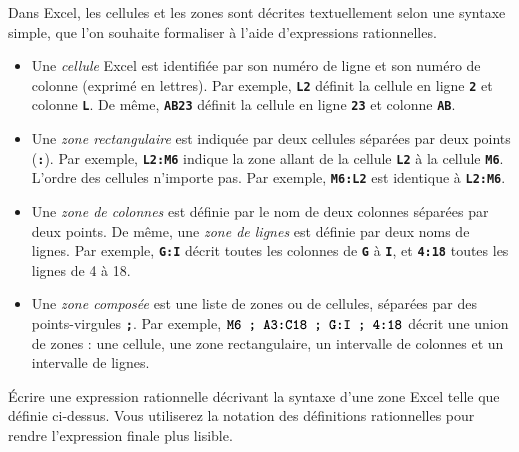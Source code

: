 
\begingroup

\newcommand{\excell}[1]{\textbf{\texttt{#1}}}

\begin{exercice}\label{exo:lexing/regexp/excel}

  Dans Excel, les cellules et les zones sont décrites textuellement selon une syntaxe simple,
  que l'on souhaite formaliser à l'aide d'expressions rationnelles.

  \begin{itemize}
  \item Une \emph{cellule} Excel est identifiée par son numéro de ligne et son numéro de colonne (exprimé en lettres).
    Par exemple, \excell{L2} définit la cellule en ligne \excell{2} et colonne \excell{L}. De même, \excell{AB23}
    définit la cellule en ligne \excell{23} et colonne \excell{AB}.

  \item Une \emph{zone rectangulaire} est indiquée par deux cellules séparées par deux points (\excell{:}).
    Par exemple, \excell{L2:M6} indique la zone allant de la cellule \excell{L2} à la cellule \excell{M6}.
    L'ordre des cellules n'importe pas. Par exemple, \excell{M6:L2} est identique à \excell{L2:M6}.

  \item Une \emph{zone de colonnes} est définie par le nom de deux colonnes séparées par deux points.
    De même, une \emph{zone de lignes} est définie par deux noms de lignes.
    Par exemple, \excell{G:I} décrit toutes les colonnes de \excell{G} à \excell{I},
    et \excell{4:18} toutes les lignes de 4 à 18.
    
  \item Une \emph{zone composée} est une liste de zones ou de cellules, séparées par des
    points-virgules \excell{;}. Par exemple, $\excell{M6 ; A3:C18 ; G:I ; 4:18}$
    décrit une union de zones : une cellule, une zone rectangulaire, un intervalle de colonnes
    et un intervalle de lignes.

  \end{itemize}

  \begin{questions}
  \item Écrire une expression rationnelle décrivant la syntaxe d'une zone Excel telle que définie ci-dessus.
    Vous utiliserez la notation des définitions rationnelles pour rendre l'expression finale plus lisible.
  \end{questions}

\end{exercice}

